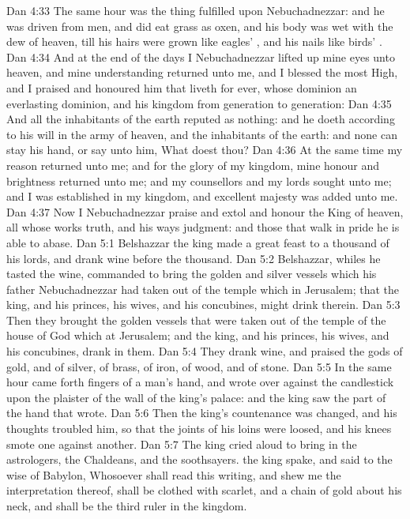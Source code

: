 \vs Dan 4:33 The same hour was the thing fulfilled upon Nebuchadnezzar: and he was driven from men, and did eat grass as oxen, and his body was wet with the dew of heaven, till his hairs were grown like eagles' , and his nails like birds' .
\vs Dan 4:34 And at the end of the days I Nebuchadnezzar lifted up mine eyes unto heaven, and mine understanding returned unto me, and I blessed the most High, and I praised and honoured him that liveth for ever, whose dominion  an everlasting dominion, and his kingdom  from generation to generation:
\vs Dan 4:35 And all the inhabitants of the earth  reputed as nothing: and he doeth according to his will in the army of heaven, and  the inhabitants of the earth: and none can stay his hand, or say unto him, What doest thou?
\vs Dan 4:36 At the same time my reason returned unto me; and for the glory of my kingdom, mine honour and brightness returned unto me; and my counsellors and my lords sought unto me; and I was established in my kingdom, and excellent majesty was added unto me.
\vs Dan 4:37 Now I Nebuchadnezzar praise and extol and honour the King of heaven, all whose works  truth, and his ways judgment: and those that walk in pride he is able to abase.
\vs Dan 5:1 Belshazzar the king made a great feast to a thousand of his lords, and drank wine before the thousand.
\vs Dan 5:2 Belshazzar, whiles he tasted the wine, commanded to bring the golden and silver vessels which his father Nebuchadnezzar had taken out of the temple which  in Jerusalem; that the king, and his princes, his wives, and his concubines, might drink therein.
\vs Dan 5:3 Then they brought the golden vessels that were taken out of the temple of the house of God which  at Jerusalem; and the king, and his princes, his wives, and his concubines, drank in them.
\vs Dan 5:4 They drank wine, and praised the gods of gold, and of silver, of brass, of iron, of wood, and of stone.
\vs Dan 5:5 In the same hour came forth fingers of a man's hand, and wrote over against the candlestick upon the plaister of the wall of the king's palace: and the king saw the part of the hand that wrote.
\vs Dan 5:6 Then the king's countenance was changed, and his thoughts troubled him, so that the joints of his loins were loosed, and his knees smote one against another.
\vs Dan 5:7 The king cried aloud to bring in the astrologers, the Chaldeans, and the soothsayers.  the king spake, and said to the wise  of Babylon, Whosoever shall read this writing, and shew me the interpretation thereof, shall be clothed with scarlet, and  a chain of gold about his neck, and shall be the third ruler in the kingdom.
